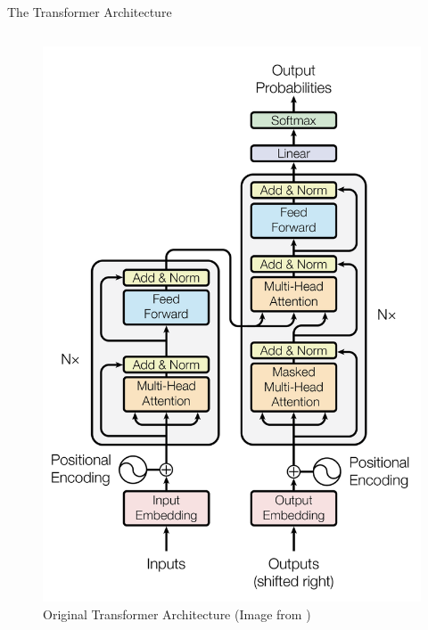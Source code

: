 \begin{frame}{The Transformer Architecture}
\begin{columns}
    \begin{figure}[ht]
        \centering
        \includegraphics[width=.9\textwidth]{figures/transformer_paper/Transformer_Original.png}
        \caption{Original Transformer Architecture (Image from \textcite{vaswani2017})
        \label{fig:transformer_orig}}
    \end{figure}


\end{columns}
\end{frame}
